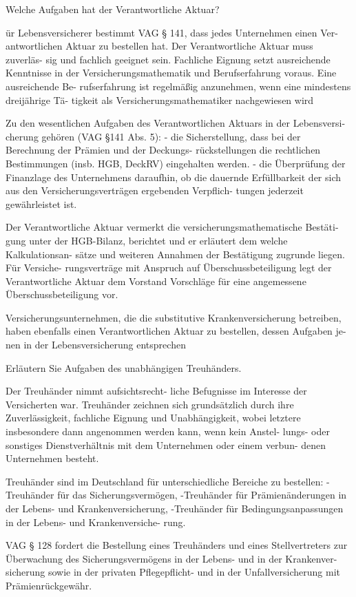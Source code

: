 Welche Aufgaben hat der Verantwortliche Aktuar?

ür Lebensversicherer bestimmt VAG § 141, dass jedes Unternehmen einen Ver-
antwortlichen Aktuar zu bestellen hat. Der Verantwortliche Aktuar muss zuverläs-
sig und fachlich geeignet sein. Fachliche Eignung setzt ausreichende Kenntnisse in
der Versicherungsmathematik und Berufserfahrung voraus. Eine ausreichende Be-
rufserfahrung ist regelmäßig anzunehmen, wenn eine mindestens dreijährige Tä-
tigkeit als Versicherungsmathematiker nachgewiesen wird

Zu den wesentlichen Aufgaben des Verantwortlichen Aktuars in der Lebensversi-
cherung gehören (VAG §141 Abs. 5):
-
die Sicherstellung, dass bei der Berechnung der Prämien und der Deckungs-
rückstellungen die rechtlichen Bestimmungen (insb. HGB, DeckRV) eingehalten
werden.
-
die Überprüfung der Finanzlage des Unternehmens daraufhin, ob die dauernde
Erfüllbarkeit der sich aus den Versicherungsverträgen ergebenden Verpflich-
tungen jederzeit gewährleistet ist.

Der Verantwortliche Aktuar vermerkt die versicherungsmathematische Bestäti-
gung unter der HGB-Bilanz, berichtet und er erläutert dem welche Kalkulationsan-
sätze und weiteren Annahmen der Bestätigung zugrunde liegen. Für Versiche-
rungsverträge mit Anspruch auf Überschussbeteiligung legt der Verantwortliche
Aktuar dem Vorstand Vorschläge für eine angemessene Überschussbeteiligung
vor.

Versicherungsunternehmen, die die substitutive Krankenversicherung betreiben,
haben ebenfalls einen Verantwortlichen Aktuar zu bestellen, dessen Aufgaben je-
nen in der Lebensversicherung entsprechen


Erläutern Sie Aufgaben des unabhängigen Treuhänders.

Der Treuhänder nimmt aufsichtsrecht-
liche Befugnisse im Interesse der Versicherten war. Treuhänder zeichnen sich
grundsätzlich durch ihre Zuverlässigkeit, fachliche Eignung und Unabhängigkeit,
wobei letztere insbesondere dann angenommen werden kann, wenn kein Anstel-
lungs- oder sonstiges Dienstverhältnis mit dem Unternehmen oder einem verbun-
denen Unternehmen besteht.

Treuhänder sind im Deutschland für unterschiedliche Bereiche zu bestellen:
-Treuhänder für das Sicherungsvermögen,
-Treuhänder für Prämienänderungen in der Lebens- und Krankenversicherung,
-Treuhänder für Bedingungsanpassungen in der Lebens- und Krankenversiche-
rung.

VAG § 128 fordert die Bestellung eines Treuhänders und eines Stellvertreters zur
Überwachung des Sicherungsvermögens in der Lebens- und in der Krankenver-
sicherung sowie in der privaten Pflegepflicht- und in der Unfallversicherung mit
Prämienrückgewähr.

